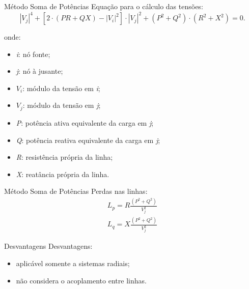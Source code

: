 \documentclass[10pt]{beamer}
\begin{document}
\begin{frame}{Método Soma de Potências}
    Equação para o cálculo das tensões:
    \begin{equation}
      \label{equ:vcespedes2}
      |V_j|^4 + [2 \cdot (PR+QX) -  |V_i|^2] \cdot  |V_j|^2 + (P^2 + Q^2) \cdot (R^2 + X^2) = 0.  
    \end{equation}
  
  onde:
  \begin{itemize}
    \item \emph{i}: nó fonte;
    \item \emph{j}: nó à jusante;
    \item \emph{$V_i$}: módulo da tensão em \emph{i};
    \item \emph{$V_j$}: módulo da tensão em \emph{j};
    \item \emph{P}: potência ativa equivalente da carga em \emph{j}; 
    \item \emph{Q}: potência reativa equivalente da carga em \emph{j}; 
    \item \emph{R}: resistência própria da linha;
    \item \emph{X}: reatância própria da linha.
  \end{itemize}

\end{frame}

\begin{frame}{Método Soma de Potências}
    Perdas nas linhas:
    \begin{eqnarray}
    \label{equ:cespedesL}
    L_p = R \frac{(P^2 + Q^2)}{V_j^2} \\
    L_q = X \frac{(P^2 + Q^2)}{V_j^2}
    \end{eqnarray}
\end{frame}

\begin{frame}{Desvantagens}
Desvantagens:
    \begin{itemize}
        \item aplicável somente a sistemas radiais;
        \item não considera o acoplamento entre linhas.
    \end{itemize}
\end{frame}
\end{document}

